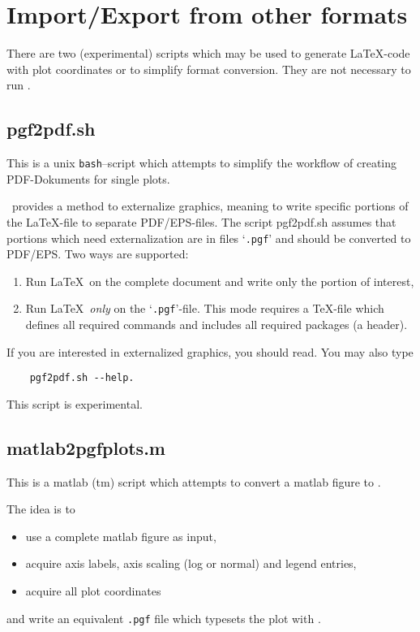 \section{Import/Export from other formats}
There are two (experimental) scripts which may be used to generate \LaTeX-code with plot coordinates or to simplify format conversion. They are not necessary to run \PGFPlots.

\subsection{pgf2pdf.sh}
This is a unix \texttt{bash}--script which attempts to simplify the workflow of creating PDF-Dokuments for single plots.

\PGF\ provides a method to externalize graphics, meaning to write specific portions of the \LaTeX-file to separate PDF/EPS-files. The script pgf2pdf.sh assumes that portions which need externalization are in files `\texttt{.pgf}' and should be converted to PDF/EPS. Two ways are supported: 
\begin{enumerate}
	\item Run \LaTeX\ on the complete document and write only the portion of interest,
	\item Run \LaTeX\ \emph{only} on the `\texttt{.pgf}'-file. This mode requires a \TeX-file which defines all required commands and includes all required packages (a header).
\end{enumerate}

If you are interested in externalized graphics, you should read\cite[Section~54]{tikz}. You may also type
\begin{lstlisting}
	pgf2pdf.sh --help.
\end{lstlisting}
This script is experimental.

\subsection{matlab2pgfplots.m}
This is a matlab (tm) script which attempts to convert a matlab figure to \PGFPlots.

The idea is to
\begin{itemize}
	\item use a complete matlab figure as input,
	\item acquire axis labels, axis scaling (log or normal) and legend entries,
	\item acquire all plot coordinates
\end{itemize}
and write an equivalent \texttt{.pgf} file which typesets the plot with \PGFPlots.


